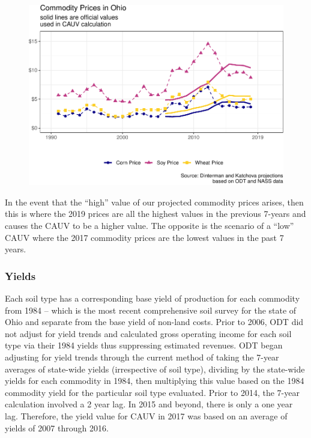 \documentclass[]{article}
\begin{document}
\begin{figure}[H]
\includegraphics[width=1\linewidth]{4-projections-2019-2020_files/figure-latex/viz-prices-1} \caption{\label{fig:prices}}\label{fig:viz-prices}
\end{figure}

In the event that the ``high'' value of our projected commodity prices
arises, then this is where the 2019 prices are all the highest values in
the previous 7-years and causes the CAUV to be a higher value. The
opposite is the scenario of a ``low'' CAUV where the 2017 commodity
prices are the lowest values in the past 7 years.

\hypertarget{yields}{%
\subsubsection{Yields}\label{yields}}

Each soil type has a corresponding base yield of production for each
commodity from 1984 -- which is the most recent comprehensive soil
survey for the state of Ohio and separate from the base yield of
non-land costs. Prior to 2006, ODT did not adjust for yield trends and
calculated gross operating income for each soil type via their 1984
yields thus suppressing estimated revenues. ODT began adjusting for
yield trends through the current method of taking the 7-year averages of
state-wide yields (irrespective of soil type), dividing by the
state-wide yields for each commodity in 1984, then multiplying this
value based on the 1984 commodity yield for the particular soil type
evaluated. Prior to 2014, the 7-year calculation involved a 2 year lag.
In 2015 and beyond, there is only a one year lag. Therefore, the yield
value for CAUV in 2017 was based on an average of yields of 2007 through
2016.
\end{document}
